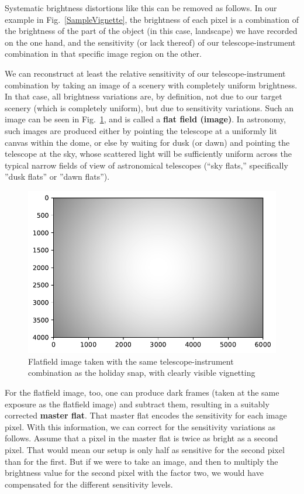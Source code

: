 \documentclass[twocolumn,apj]{openjournal}
\begin{document}
Systematic brightness distortions like this can be removed as follows. In our example in Fig.~\ref{SampleVignette}, the brightness of each pixel is a combination of the brightness of the part of the object (in this case, landscape) we have recorded on the one hand, and the sensitivity (or lack thereof) of our telescope-instrument combination in that specific image region on the other.

We can reconstruct at least the relative sensitivity of our telescope-instrument combination by taking an image of a scenery with completely uniform brightness. In that case, all brightness variations are, by definition, not due to our target scenery (which is completely uniform), but due to sensitivity variations. Such an image can be seen in Fig.~\ref{SampleVignetteFF}, and is called a {\bf flat field (image)}. In astronomy, such images are produced either by pointing the telescope at a uniformly lit canvas within the dome, or else by waiting for dusk (or dawn) and pointing the telescope at the sky, whose scattered light will be sufficiently uniform across the typical narrow fields of view of astronomical telescopes (``sky flats,'' specifically ''dusk flats'' or ''dawn flats'').
\begin{figure}[htbp]
\begin{center}
\includegraphics[width=0.9\linewidth]{flatfield-ff.pdf}
\caption{Flatfield image taken with the same telescope-instrument combination as the holiday snap, with clearly visible vignetting}
\label{SampleVignetteFF}
\end{center}
\end{figure}
For the flatfield image, too, one can produce dark frames (taken at the same exposure as the flatfield image) and subtract them, resulting in a suitably corrected {\bf master flat}. That master flat encodes the sensitivity for each image pixel. With this information, we can correct for the sensitivity variations as follows. Assume that a pixel in the master flat is twice as bright as a second pixel. That would mean our setup is only half as sensitive for the second pixel than for the first. But if we were to take an image, and then to multiply the brightness value for the second pixel with the factor two, we would have compensated for the different sensitivity levels.
\end{document}
